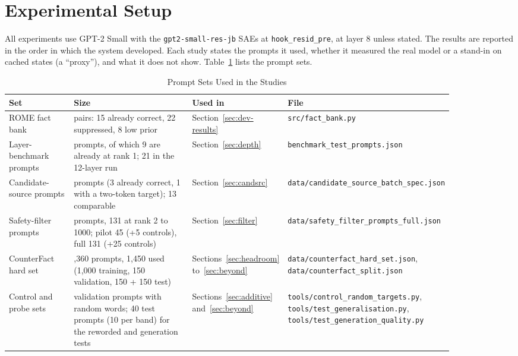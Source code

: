 \documentclass[12pt,a4paper]{report}
\begin{document}
\section{Experimental Setup}\label{sec:setup}

All experiments use GPT-2 Small with the \texttt{gpt2-small-res-jb} SAEs at \texttt{hook\_\allowbreak{}resid\_\allowbreak{}pre}, at layer 8 unless stated. The results are reported in the order in which the system developed. Each study states the prompts it used, whether it measured the real model or a stand-in on cached states (a ``proxy''), and what it does not show. Table~\ref{tab:sets} lists the prompt sets.

\begin{table}[H]
\centering
\caption{Prompt Sets Used in the Studies}\label{tab:sets}
{\small\renewcommand{\arraystretch}{1.15}
\begin{tabular}{|>{\raggedright\arraybackslash}p{0.169\linewidth}|>{\raggedright\arraybackslash}p{0.357\linewidth}|>{\raggedright\arraybackslash}p{0.139\linewidth}|>{\raggedright\arraybackslash}p{0.208\linewidth}|}
\hline
\textbf{Set} & \textbf{Size} & \textbf{Used in} & \textbf{File} \\ \hline
ROME fact bank & 45 pairs: 15 already correct, 22 suppressed, 8 low prior & Section~\ref{sec:dev-results} & \texttt{src/\allowbreak{}fact\_\allowbreak{}bank.\allowbreak{}py} \\ \hline
Layer-benchmark prompts & 22 prompts, of which 9 are already at rank 1; 21 in the 12-layer run & Section~\ref{sec:depth} & \texttt{benchmark\_\allowbreak{}test\_\allowbreak{}prompts.\allowbreak{}json} \\ \hline
Candidate-source prompts & 17 prompts (3 already correct, 1 with a two-token target); 13 comparable & Section~\ref{sec:candsrc} & \texttt{data/\allowbreak{}candidate\_\allowbreak{}source\_\allowbreak{}batch\_\allowbreak{}spec.\allowbreak{}json} \\ \hline
Safety-filter prompts & 211 prompts, 131 at rank 2 to 1000; pilot 45 (+5 controls), full 131 (+25 controls) & Section~\ref{sec:filter} & \texttt{data/\allowbreak{}safety\_\allowbreak{}filter\_\allowbreak{}prompts\_\allowbreak{}full.\allowbreak{}json} \\ \hline
CounterFact hard set & 16,360 prompts, 1,450 used (1,000 training, 150 validation, 150 + 150 test) & Sections~\ref{sec:headroom} to~\ref{sec:beyond} & \texttt{data/\allowbreak{}counterfact\_\allowbreak{}hard\_\allowbreak{}set.\allowbreak{}json}, \texttt{data/\allowbreak{}counterfact\_\allowbreak{}split.\allowbreak{}json} \\ \hline
Control and probe sets & 20 validation prompts with random words; 40 test prompts (10 per band) for the reworded and generation tests & Sections~\ref{sec:additive} and~\ref{sec:beyond} & \texttt{tools/\allowbreak{}control\_\allowbreak{}random\_\allowbreak{}targets.\allowbreak{}py}, \texttt{tools/\allowbreak{}test\_\allowbreak{}generalisation.\allowbreak{}py}, \texttt{tools/\allowbreak{}test\_\allowbreak{}generation\_\allowbreak{}quality.\allowbreak{}py} \\ \hline
\end{tabular}}
\end{table}
\end{document}
